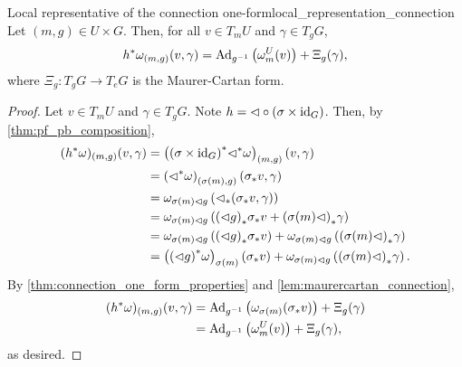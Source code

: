 \begin{theorem}{Local representative of the connection one-form}{local_representation_connection}
    Let \((m, g) \in U \times G\). Then, for all \(v \in T_mU\) and \(\gamma \in T_gG\),
    \begin{equation*}
        {h}^{\ast}_{}{\omega}_{(m,g)}(v,\gamma) = \operatorname{Ad}_{g^{-1}}\left(\omega_m^U(v)\right) + \Xi_g(\gamma),
    \end{equation*}
    where \(\Xi_g : T_gG \to T_eG\) is the Maurer-Cartan form.
\end{theorem}
\begin{proof}
    Let \(v \in T_mU\) and \(\gamma \in T_gG\). Note\nocite{cj_isham_dg} \(h = \mathbin{\vartriangleleft} \circ (\sigma \times \operatorname{id}_{G})\). Then, by \cref{thm:pf_pb_composition},
    \begin{align*}
        ({h}^{\ast}_{}{\omega})_{(m,g)}(v, \gamma) &= \left({(\sigma \times \operatorname{id}_{G})}^{\ast}_{}{{\mathbin{\vartriangleleft}}^{\ast}_{}{\omega}}\right)_{(m,g)}(v,\gamma)\\
                                          &= \left({\mathbin{\vartriangleleft}}^{\ast}_{}{\omega}\right)_{(\sigma(m), g)}({\sigma}_{\ast{}}{v}, \gamma)\\
                                          &= \omega_{\sigma(m) \mathbin{\vartriangleleft} g}\left({\mathbin{\vartriangleleft}}_{\ast{}}{({\sigma}_{\ast{}}{v}, \gamma)}\right)\\
                                          &= \omega_{\sigma(m) \mathbin{\vartriangleleft} g}\left({(\mathbin{\vartriangleleft} g)}_{\ast{}}{{\sigma}_{\ast{}}{v}} + {(\sigma(m)\mathbin{\vartriangleleft})}_{\ast{}}{\gamma}\right)\\
                                          &= \omega_{\sigma(m)\mathbin{\vartriangleleft} g}\left({(\mathbin{\vartriangleleft} g)}_{\ast{}}{{\sigma}_{\ast{}}{v}}\right) + \omega_{\sigma(m)\mathbin{\vartriangleleft} g}\left({\left(\sigma(m) \mathbin{\vartriangleleft}\right)}_{\ast{}}{\gamma}\right)\\
                                          &= \left({(\mathbin{\vartriangleleft} g)}^{\ast}_{}{\omega}\right)_{\sigma(m)}({\sigma}_{\ast{}}{v}) + \omega_{\sigma(m)\mathbin{\vartriangleleft} g}\left({\left(\sigma(m) \mathbin{\vartriangleleft}\right)}_{\ast{}}{\gamma}\right).
    \end{align*}
    By \cref{thm:connection_one_form_properties} and \cref{lem:maurercartan_connection},
    \begin{align*}
        ({h}^{\ast}_{}{\omega})_{(m,g)}(v, \gamma) &= \operatorname{Ad}_{g^{-1}}\left(\omega_{\sigma(m)}({\sigma}_{\ast{}}{v})\right) + \Xi_g(\gamma)\\
                                            &= \operatorname{Ad}_{g^{-1}}\left(\omega^U_{m}(v)\right) + \Xi_g(\gamma),
    \end{align*}
    as desired.
\end{proof}

